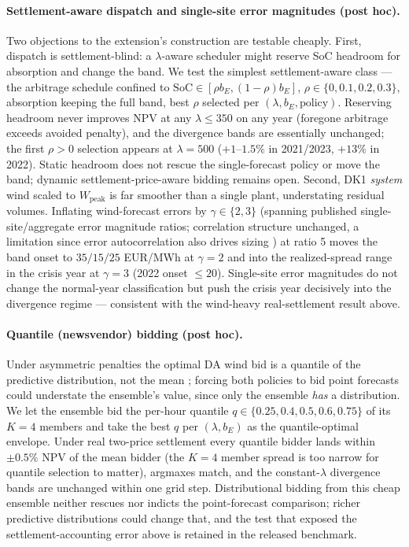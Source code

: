 \documentclass[11pt]{article}
\begin{document}
\paragraph{Settlement-aware dispatch and single-site error magnitudes (post hoc).} Two objections to the extension's construction are testable cheaply. First, dispatch is settlement-blind: a $\lambda$-aware scheduler might reserve SoC headroom for absorption and change the band. We test the simplest settlement-aware class --- the arbitrage schedule confined to $\mathrm{SoC} \in [\rho b_E, (1-\rho) b_E]$, $\rho \in \{0, 0.1, 0.2, 0.3\}$, absorption keeping the full band, best $\rho$ selected per $(\lambda, b_E, \mathrm{policy})$. Reserving headroom never improves NPV at any $\lambda \leq 350$ on any year (foregone arbitrage exceeds avoided penalty), and the divergence bands are essentially unchanged; the first $\rho > 0$ selection appears at $\lambda = 500$ ($+1$--$1.5\%$ in 2021/2023, $+13\%$ in 2022). Static headroom does not rescue the single-forecast policy or move the band; dynamic settlement-price-aware bidding remains open. Second, DK1 \emph{system} wind scaled to $W_{\mathrm{peak}}$ is far smoother than a single plant, understating residual volumes. Inflating wind-forecast errors by $\gamma \in \{2, 3\}$ (spanning published single-site/aggregate error magnitude ratios; correlation structure unchanged, a limitation since error autocorrelation also drives sizing \citep{haessig2015storage}) at ratio 5 moves the band onset to $35/15/25$ EUR/MWh at $\gamma = 2$ and into the realized-spread range in the crisis year at $\gamma = 3$ (2022 onset $\leq 20$). Single-site error magnitudes do not change the normal-year classification but push the crisis year decisively into the divergence regime --- consistent with the wind-heavy real-settlement result above.

\paragraph{Quantile (newsvendor) bidding (post hoc).} Under asymmetric penalties the optimal DA wind bid is a quantile of the predictive distribution, not the mean \citep{pinson2007trading}; forcing both policies to bid point forecasts could understate the ensemble's value, since only the ensemble \emph{has} a distribution. We let the ensemble bid the per-hour quantile $q \in \{0.25, 0.4, 0.5, 0.6, 0.75\}$ of its $K{=}4$ members and take the best $q$ per $(\lambda, b_E)$ as the quantile-optimal envelope. Under real two-price settlement every quantile bidder lands within $\pm 0.5\%$ NPV of the mean bidder (the $K{=}4$ member spread is too narrow for quantile selection to matter), argmaxes match, and the constant-$\lambda$ divergence bands are unchanged within one grid step. Distributional bidding from this cheap ensemble neither rescues nor indicts the point-forecast comparison; richer predictive distributions could change that, and the test that exposed the settlement-accounting error above is retained in the released benchmark.
\end{document}
